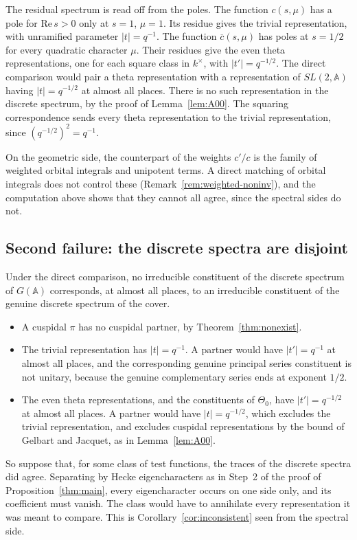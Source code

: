 \documentclass[12pt,letterpaper,openany]{book}
\theoremstyle{plain}
\theoremstyle{definition}
\theoremstyle{remark}
\theoremstyle{remark}
\begin{document}
The residual spectrum is read off from the poles. The function $c(s,\mu)$
has a pole for $\mathrm{Re}\,s>0$ only at $s=1$, $\mu=1$. Its residue gives
the trivial representation, with unramified parameter $|t|=q^{-1}$. The
function $\overline c(s,\mu)$ has poles at $s=1/2$ for every quadratic
character $\mu$. Their residues give the even theta representations, one
for each square class in $k^\times$, with $|t'|=q^{-1/2}$. The direct
comparison would pair a theta representation with a representation of
$SL(2,{\mathbb A})$ having $|t|=q^{-1/2}$ at almost all places. There is no
such representation in the discrete spectrum, by the proof of
Lemma~\ref{lem:A00}. The squaring correspondence sends every theta
representation to the trivial representation, since $(q^{-1/2})^2=q^{-1}$.

On the geometric side, the counterpart of the weights $c'/c$ is the
family of weighted orbital integrals and unipotent terms. A direct
matching of orbital integrals does not control these
(Remark~\ref{rem:weighted-noninv}), and the computation above shows that
they cannot all agree, since the spectral sides do not.

\subsection*{Second failure: the discrete spectra are disjoint}

Under the direct comparison, no irreducible constituent of the discrete
spectrum of $G({\mathbb A})$ corresponds, at almost all places, to an
irreducible constituent of the genuine discrete spectrum of the cover.
\begin{itemize}
\item A cuspidal $\pi$ has no cuspidal partner, by
Theorem~\ref{thm:nonexist}.
\item The trivial representation has $|t|=q^{-1}$. A partner would have
$|t'|=q^{-1}$ at almost all places, and the corresponding genuine
principal series constituent is not unitary, because the genuine
complementary series ends at exponent $1/2$.
\item The even theta representations, and the constituents of
$\Theta_0$, have $|t'|=q^{-1/2}$ at almost all places. A partner would
have $|t|=q^{-1/2}$, which excludes the trivial representation, and
excludes cuspidal representations by the bound of Gelbart and Jacquet, as
in Lemma~\ref{lem:A00}.
\end{itemize}
So suppose that, for some class of test functions, the traces of the
discrete spectra did agree. Separating by Hecke eigencharacters as in
Step~2 of the proof of Proposition~\ref{thm:main}, every eigencharacter
occurs on one side only, and its coefficient must vanish. The class would
have to annihilate every representation it was meant to compare. This is
Corollary~\ref{cor:inconsistent} seen from the spectral side.
\end{document}
